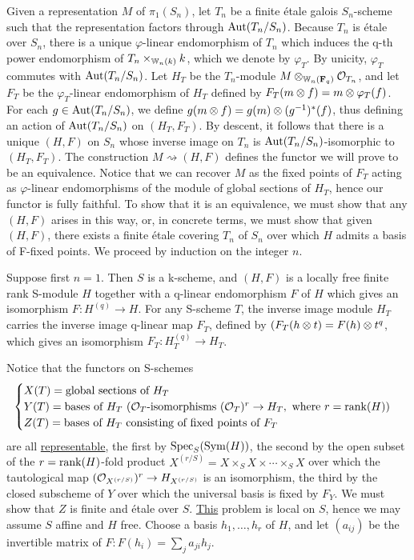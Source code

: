 \begin{kaproof}
Given a representation $M$ of $\pi_1(S_n)$, let $T_n$ be a finite \'etale galois
$S_n$-scheme such that the representation factors through $\operatorname{Aut}(T_n/S_n)$.
Because $T_n$ is \'etale over $S_n$, there is a unique $\varphi$-linear
endomorphism of $T_n$ which induces the q-th power endomorphism of
$T_n\times_{\mathbb{W}_n(k)}k$, which we denote by $\varphi_T$. By unicity, $\varphi_T$
commutes with $\operatorname{Aut}(T_n/S_n)$. Let $H_T$ be the $T_n$-module
$M\otimes_{\mathbb{W}_n(\mathbf{F}_q)}\mathcal{O}_{T_n}$, and let $F_T$ be the $\varphi_T$-linear
endomorphism of $H_T$ defined by $F_T(m\otimes f)=m\otimes\varphi_T(f)$. For each
$g\in\operatorname{Aut}(T_n/S_n)$, we define $g(m\otimes f)=g(m)\otimes(g^{-1})^*(f)$, thus
defining an action of $\operatorname{Aut}(T_n/S_n)$ on $(H_T,F_T)$. By descent, it follows
that there is a unique $(H,F)$ on $S_n$ whose inverse image on $T_n$ is
$\operatorname{Aut}(T_n/S_n)$-isomorphic to $(H_T,F_T)$. The construction
$M\rightsquigarrow(H,F)$ defines the functor we will prove to be an equivalence.
Notice that we can recover $M$ as the fixed points of $F_T$ acting as
$\varphi$-linear endomorphisms of the module of global sections of $H_T$, hence
our functor is fully faithful. To show that it is an equivalence, we must show
that any $(H,F)$ arises in this way, or, in concrete terms, we must show that
given $(H,F)$, there exists a finite \'etale covering $T_n$ of $S_n$ over which
$H$ admits a basis of F-fixed points. We proceed by induction on the integer
$n$.

Suppose first $n=1$. Then $S$ is a k-scheme, and $(H,F)$ is a locally free
finite rank S-module $H$ together with a q-linear endomorphism $F$ of $H$ which
gives an isomorphism $F\colon H^{(q)}\to H$. For any S-scheme $T$, the inverse
image module $H_T$ carries the inverse image q-linear map $F_T$, defined by
$(F_T(h\otimes t)=F(h)\otimes t^q$, which gives an isomorphism
$F_T\colon H_T^{(q)}\to H_T$.

Notice that the functors on S-schemes
\[
\begin{cases}
X(T) = \text{global sections of } H_T \\
Y(T) = \text{bases of } H_T\ (\mathcal{O}_T\text{-isomorphisms }(\mathcal{O}_T)^r\to H_T,\text{ where } r=\operatorname{rank}(H)) \\
Z(T) = \text{bases of } H_T \text{ consisting of fixed points of } F_T
\end{cases}
\]
are all \uline{representable}, the first by $\operatorname{Spec}_S(\operatorname{Sym}(H))$, the second by
the open subset of the $r=\operatorname{rank}(H)$-fold product
$X^{(r/S)}=X\times_S X\times\cdots\times_S X$ over which the tautological map
$(\mathcal{O}_{X^{(r/S)}})^r\to H_{X^{(r/S)}}$ is an isomorphism, the third by the
closed subscheme of $Y$ over which the universal basis is fixed by $F_Y$. We
must show that $Z$ is finite and \'etale over $S$. \uline{This} problem is local
on $S$, hence we may assume $S$ affine and $H$ free. Choose a basis
$h_1,\dots,h_r$ of $H$, and let $(a_{ij})$ be the invertible matrix of
$F\colon F(h_i)=\sum_j a_{ji}h_j$.


\end{kaproof}
